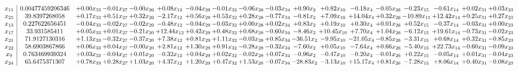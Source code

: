 \documentclass[9pt]{article}
\begin{document}
 \[\begin{array}{c| c c@{\hskip 2pt} c@{\hskip 2pt} c@{\hskip 2pt} c@{\hskip 2pt} c@{\hskip 2pt} c@{\hskip 2pt} c@{\hskip 2pt} c@{\hskip 2pt} c@{\hskip 2pt} c@{\hskip 2pt} c@{\hskip 2pt} c@{\hskip 2pt} c@{\hskip 2pt} c@{\hskip 2pt} c@{\hskip 2pt} c@{\hskip 2pt} }
 x_{11}   &  0.00477459206346 & +  0.00 x_{33} & -0.01 x_{27} & -0.00 x_{20} & +  0.08 x_{12} & -0.04 x_{29} & -0.01 x_{32} & -0.06 x_{28} & -0.03 x_{34} & +  0.90 x_{2} & +  0.82 x_{10} & -0.18 x_{4} & -0.05 x_{26} & -0.23 x_{15} & -0.61 x_{14} & +  0.02 x_{31} & +  0.03 x_{23}\\
 x_{25}   &  39.8397268058 & +  0.17 x_{33} & +  0.51 x_{27} & +  0.32 x_{20} & -2.17 x_{12} & +  0.56 x_{29} & +  0.53 x_{32} & +  0.28 x_{28} & -0.77 x_{34} & -0.81 x_{2} & +  7.09 x_{10} & + 14.04 x_{4} & +  0.32 x_{26} & -10.89 x_{15} & + 12.42 x_{14} & +  0.25 x_{31} & +  0.27 x_{23}\\
 x_{13}   &  0.227622656451 & -0.04 x_{33} & -0.02 x_{27} & -0.02 x_{20} & -0.48 x_{12} & -0.04 x_{29} & -0.03 x_{32} & +  0.00 x_{28} & +  0.02 x_{34} & +  0.83 x_{2} & +  0.19 x_{10} & +  0.30 x_{4} & +  0.01 x_{26} & +  0.52 x_{15} & -0.37 x_{14} & -0.03 x_{31} & +  0.00 x_{23}\\
 x_{17}   &  33.931585411 & +  0.05 x_{33} & +  0.01 x_{27} & -0.21 x_{20} & + 12.44 x_{12} & +  0.42 x_{29} & +  0.48 x_{32} & +  0.68 x_{28} & -0.60 x_{34} & -8.46 x_{2} & + 10.45 x_{10} & +  7.70 x_{4} & +  1.04 x_{26} & -6.12 x_{15} & + 19.61 x_{14} & -0.73 x_{31} & -0.02 x_{23}\\
 x_{21}   &  71.9127130316 & +  1.13 x_{33} & -0.32 x_{27} & -0.37 x_{20} & +  7.38 x_{12} & +  0.81 x_{29} & +  1.11 x_{32} & -0.03 x_{28} & +  0.85 x_{34} & -36.51 x_{2} & -9.95 x_{10} & -21.05 x_{4} & -0.85 x_{26} & -3.31 x_{15} & +  0.68 x_{14} & +  0.32 x_{31} & -0.85 x_{23}\\
 x_{22}   &  58.6903867866 & +  0.06 x_{33} & +  0.04 x_{27} & -0.00 x_{20} & +  2.81 x_{12} & +  1.30 x_{29} & +  0.91 x_{32} & -0.28 x_{28} & -0.32 x_{34} & -7.60 x_{2} & +  0.05 x_{10} & -7.64 x_{4} & +  0.66 x_{26} & -5.40 x_{15} & + 22.73 x_{14} & -0.60 x_{31} & -0.09 x_{23}\\
 x_{9}   &  0.763469939324 & +  0.03 x_{33} & -0.04 x_{27} & +  0.01 x_{20} & -0.32 x_{12} & +  0.04 x_{29} & +  0.02 x_{32} & -0.02 x_{28} & +  0.07 x_{34} & -0.96 x_{2} & -0.47 x_{10} & -0.20 x_{4} & -0.01 x_{26} & +  0.22 x_{15} & -0.05 x_{14} & +  0.01 x_{31} & -0.04 x_{23}\\
 x_{24}   &  65.6475371307 & +  0.78 x_{33} & +  0.28 x_{27} & +  1.03 x_{20} & +  4.37 x_{12} & +  1.20 x_{29} & +  0.47 x_{32} & +  1.53 x_{28} & -0.07 x_{34} & -28.83 x_{2} & -3.13 x_{10} & + 15.17 x_{4} & +  0.81 x_{26} & -7.28 x_{15} & +  8.06 x_{14} & +  0.40 x_{31} & -0.08 x_{23}\\

\end{array}\]
\end{document}
